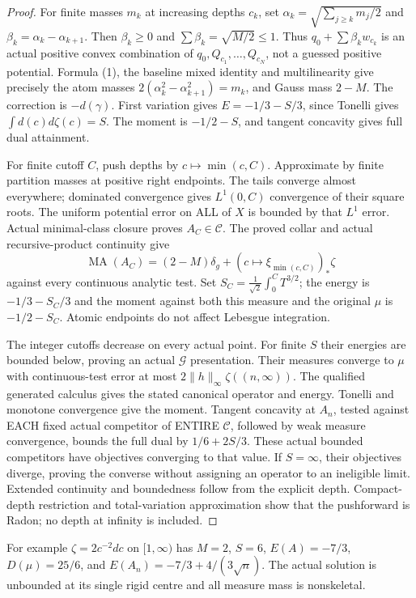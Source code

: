 \documentclass[11pt]{article}
\newcommand{\MA}{\operatorname{MA}}
\newcommand{\C}{\mathcal C}
\newcommand{\G}{\mathcal G}
\begin{document}
\begin{proof}
For finite masses $m_k$ at increasing depths $c_k$, set
$\alpha_k=\sqrt{\sum_{j\ge k}m_j/2}$ and
$\beta_k=\alpha_k-\alpha_{k+1}$. Then $\beta_k\ge0$ and
$\sum\beta_k=\sqrt{M/2}\le1$. Thus
$q_0+\sum\beta_k w_{c_k}$ is an actual positive convex
combination of $q_0,Q_{c_1},\ldots,Q_{c_N}$, not a guessed
positive potential. Formula (1), the baseline mixed identity and
multilinearity give precisely the atom masses
$2(\alpha_k^2-\alpha_{k+1}^2)=m_k$, and Gauss mass $2-M$.
The correction is $-d(\gamma)$. First variation gives
$E=-1/3-S/3$, since Tonelli gives $\int d(c)d\zeta(c)=S$.
The moment is $-1/2-S$, and tangent concavity gives full dual attainment.

For finite cutoff $C$, push depths by $c\mapsto\min(c,C)$.
Approximate by finite partition masses at positive right endpoints.
The tails converge almost everywhere; dominated convergence gives
$L^1(0,C)$ convergence of their square roots. The uniform potential
error on ALL of $X$ is bounded by that $L^1$ error. Actual
minimal-class closure proves $A_C\in\C$. The proved collar and
actual recursive-product continuity give
\[
 \MA(A_C)=(2-M)\delta_g+(c\mapsto\xi_{\min(c,C)})_*\zeta
\]
against every continuous analytic test. Set
$S_C=\frac1{\sqrt2}\int_0^C T^{3/2}$; the energy is
$-1/3-S_C/3$ and the moment against both this measure and the
original $\mu$ is $-1/2-S_C$. Atomic endpoints do not affect
Lebesgue integration.

The integer cutoffs decrease on every actual point. For finite
$S$ their energies are bounded below, proving an actual $\G$
presentation. Their measures converge to $\mu$ with continuous-test
error at most $2\|h\|_\infty\zeta((n,\infty))$. The qualified
generated calculus gives the stated canonical operator and energy.
Tonelli and monotone convergence give the moment.
Tangent concavity at $A_n$, tested against EACH fixed actual
competitor of ENTIRE $\C$, followed by weak measure convergence,
bounds the full dual by $1/6+2S/3$. These actual bounded
competitors have objectives converging to that value.
If $S=\infty$, their objectives diverge, proving the converse
without assigning an operator to an ineligible limit.
Extended continuity and boundedness follow from the explicit depth.
Compact-depth restriction and total-variation approximation show
that the pushforward is Radon; no depth at infinity is included.
\end{proof}

For example $\zeta=2c^{-2}dc$ on $[1,\infty)$ has $M=2$,
$S=6$, $E(A)=-7/3$, $D(\mu)=25/6$, and
$E(A_n)=-7/3+4/(3\sqrt n)$. The actual solution is unbounded
at its single rigid centre and all measure mass is nonskeletal.
\end{document}
